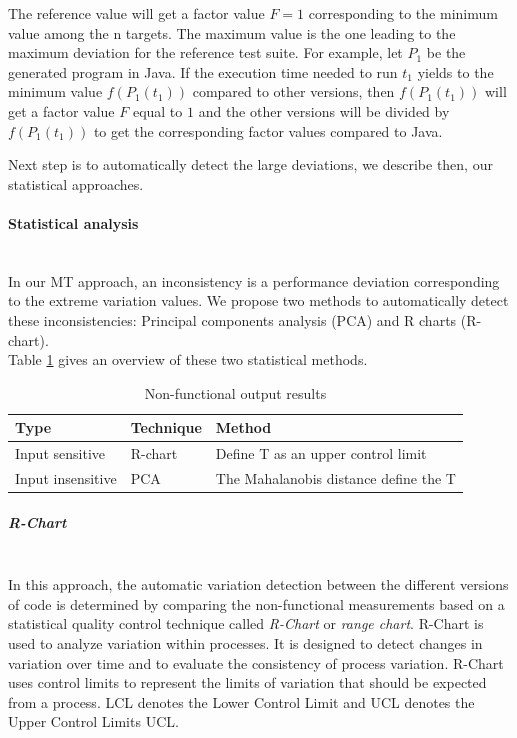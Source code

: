 The reference value will get a factor value $F = 1$ corresponding to the minimum value among the n targets. The maximum value is the one leading to the maximum deviation for the reference test suite. For example, let $P_{1}$ be the generated program in Java. If the execution time needed to run $t_{1}$ yields to the minimum value $f(P_{1}(t_{1}))$ compared to other versions, then $f(P_{1}(t_{1}))$ will get a factor value $F$ equal to $1$ and the other versions will be divided by $f(P_{1}(t_{1}))$ to get the corresponding factor values compared to Java.

Next step is to automatically detect the large deviations, we describe then, our statistical approaches.

\paragraph{Statistical analysis}~\\ 
In our MT approach, an inconsistency is a performance deviation corresponding to the extreme variation values.
We propose two methods to automatically detect these inconsistencies: Principal components analysis (PCA) and R charts (R-chart).\\
Table \ref{tab:Statistical methods} gives an overview of these two statistical methods.
\begin{table}[h]
	\centering
	
	\begin{tabular}{|l| l |l |}				
		\hline
		
		\textbf{Type} &  \textbf{Technique} &  \textbf{Method}    \\ \hline
		Input sensitive  &  R-chart &  Define T as an upper control limit  \\ \hline
		Input insensitive &  PCA &  The Mahalanobis distance define the T \\ \hline
	\end{tabular}
	
	\caption{Non-functional output results}
	\label{tab:Statistical methods}
\end{table}

\subparagraph{R-Chart}~\\
In this approach, the automatic variation detection between the different versions of code is determined by comparing the non-functional measurements based on a statistical quality control technique called \textit{R-Chart} or \textit{range chart}. 
R-Chart is used to analyze variation within processes. It is designed to detect changes in variation over time and to evaluate the consistency of process variation.
R-Chart uses control limits to represent the limits of variation that should be expected from a process. LCL denotes the Lower Control Limit and UCL denotes the Upper Control Limits UCL.
 

